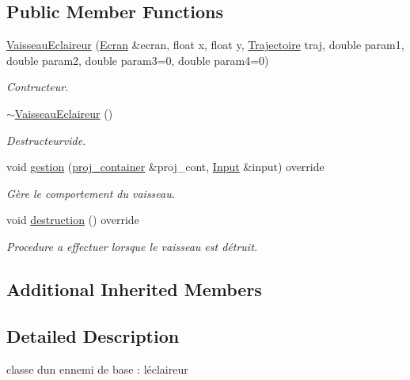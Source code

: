\subsection*{Public Member Functions}
\begin{DoxyCompactItemize}
\item 
\mbox{\hyperlink{class_vaisseau_eclaireur_a3e02d4ef7316d0a44148c785c376deb2}{Vaisseau\+Eclaireur}} (\mbox{\hyperlink{class_ecran}{Ecran}} \&ecran, float x, float y, \mbox{\hyperlink{_trajectoire_8h_afa7f6e8323d7ee755d93cd1f6019dd95}{Trajectoire}} traj, double param1, double param2, double param3=0, double param4=0)
\begin{DoxyCompactList}\small\item\em Contructeur. \end{DoxyCompactList}\item 
\mbox{\hyperlink{class_vaisseau_eclaireur_a3e7ef82ff40bf4736d4285311dd8624c}{$\sim$\+Vaisseau\+Eclaireur}} ()
\begin{DoxyCompactList}\small\item\em Destructeurvide. \end{DoxyCompactList}\item 
void \mbox{\hyperlink{class_vaisseau_eclaireur_a66811ba07fd951304cca1c8be457b8e4}{gestion}} (\mbox{\hyperlink{def__type_8h_a87980cd8ee9533e561a73e8bbc728188}{proj\+\_\+container}} \&proj\+\_\+cont, \mbox{\hyperlink{_input_8h_a5588d60d674991c719a8df848313e966}{Input}} \&input) override
\begin{DoxyCompactList}\small\item\em Gère le comportement du vaisseau. \end{DoxyCompactList}\item 
void \mbox{\hyperlink{class_vaisseau_eclaireur_ab4ea82a8fc92dc27c6072481099518bc}{destruction}} () override
\begin{DoxyCompactList}\small\item\em Procedure a effectuer lorsque le vaisseau est détruit. \end{DoxyCompactList}\end{DoxyCompactItemize}
\subsection*{Additional Inherited Members}


\subsection{Detailed Description}
classe d\textquotesingle{}un ennemi de base \+: l\textquotesingle{}éclaireur 


